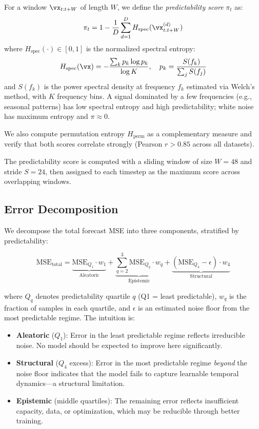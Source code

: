 \documentclass[10pt]{article}
\newcommand{\spectent}{H_{\text{spec}}}
\newcommand{\perment}{H_{\text{perm}}}
\newcommand{\predscore}{\pi}
\begin{document}
For a window $\vx_{t:t+W}$ of length $W$, we define the \emph{predictability score} $\predscore_t$ as:
\begin{equation}
    \predscore_t = 1 - \frac{1}{D} \sum_{d=1}^{D} \spectent(\vx^{(d)}_{t:t+W})
    \label{eq:predscore}
\end{equation}
where $\spectent(\cdot) \in [0,1]$ is the normalized spectral entropy:
\begin{equation}
    \spectent(\vx) = -\frac{\sum_k p_k \log p_k}{\log K}, \quad p_k = \frac{S(f_k)}{\sum_j S(f_j)}
\end{equation}
and $S(f_k)$ is the power spectral density at frequency $f_k$ estimated via Welch's method, with $K$ frequency bins. A signal dominated by a few frequencies (e.g., seasonal patterns) has low spectral entropy and high predictability; white noise has maximum entropy and $\predscore \approx 0$.

We also compute permutation entropy $\perment$ \citep{bandt2002permutation} as a complementary measure and verify that both scores correlate strongly (Pearson $r > 0.85$ across all datasets).

The predictability score is computed with a sliding window of size $W=48$ and stride $S=24$, then assigned to each timestep as the maximum score across overlapping windows.

\subsection{Error Decomposition}
\label{sec:decomposition}

We decompose the total forecast MSE into three components, stratified by predictability:

\begin{equation}
    \text{MSE}_{\text{total}} = \underbrace{\text{MSE}_{Q_1} \cdot w_1}_{\text{Aleatoric}} + \underbrace{\sum_{q=2}^{3} \text{MSE}_{Q_q} \cdot w_q}_{\text{Epistemic}} + \underbrace{(\text{MSE}_{Q_4} - \epsilon) \cdot w_4}_{\text{Structural}}
    \label{eq:decomp}
\end{equation}

where $Q_q$ denotes predictability quartile $q$ (Q1 = least predictable), $w_q$ is the fraction of samples in each quartile, and $\epsilon$ is an estimated noise floor from the most predictable regime. The intuition is:

\begin{itemize}
    \item \textbf{Aleatoric} ($Q_1$): Error in the least predictable regime reflects irreducible noise. No model should be expected to improve here significantly.
    \item \textbf{Structural} ($Q_4$ excess): Error in the most predictable regime \emph{beyond} the noise floor indicates that the model fails to capture learnable temporal dynamics---a structural limitation.
    \item \textbf{Epistemic} (middle quartiles): The remaining error reflects insufficient capacity, data, or optimization, which may be reducible through better training.
\end{itemize}
\end{document}
